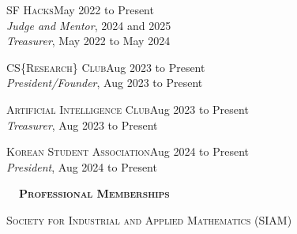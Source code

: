 \documentclass[hidelinks, 10pt]{article}
\def\contentwidth{0.9\linewidth}    %
\def\contentblockspacing{2.5mm}     %
\def\sectionspacing{8mm}            %
\def\sectiontocontentspacing{4mm}   %
\renewcommand{\section}[1]{
    {\fontsize{14}{14}\selectfont \textsc{\textbf{\ \ #1\ \ }}}\hrulefill
}
\begin{document}
{\vspace{\contentblockspacing}

\begin{minipage}[ct]{\contentwidth}
    \textsc{SF Hacks}\hfill May 2022 to Present\\
    \emph{Judge and Mentor}, 2024 and 2025\\
    \emph{Treasurer}, May 2022 to May 2024
\end{minipage}

\vspace{\contentblockspacing}

\begin{minipage}[ct]{\contentwidth}
    \textsc{CS}\{\textsc{Research}\}\textsc{ Club}\hfill Aug 2023 to Present\\
    \emph{President/Founder}, Aug 2023 to Present
\end{minipage}

\vspace{\contentblockspacing}

\begin{minipage}[ct]{\contentwidth}
    \textsc{Artificial Intelligence Club}\hfill Aug 2023 to Present\\
    \emph{Treasurer}, Aug 2023 to Present
\end{minipage}

\vspace{\contentblockspacing}

\begin{minipage}[ct]{\contentwidth}
    \textsc{Korean Student Association}\hfill Aug 2024 to Present\\
    \emph{President}, Aug 2024 to Present
\end{minipage}

\vspace{\sectionspacing}


\section{Professional Memberships}

\vspace{\sectiontocontentspacing}

\begin{minipage}[ct]{\contentwidth}
    \textsc{Society for Industrial and Applied Mathematics} (SIAM)
\end{minipage}

}
\end{document}
